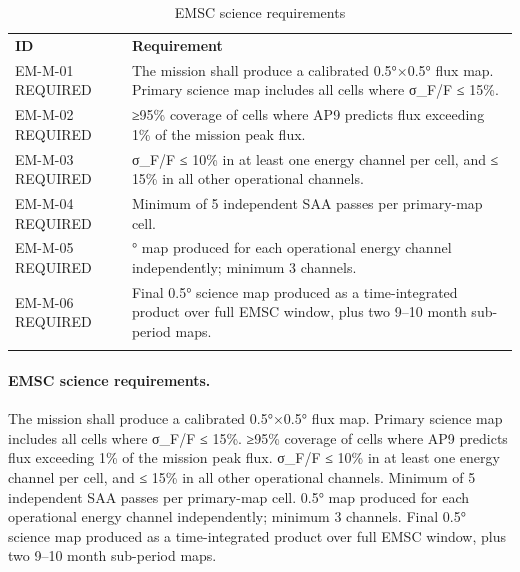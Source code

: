 \ifrequirementsedition
\begin{longtable}{@{}
  >{\raggedright\arraybackslash}p{}
  >{\raggedright\arraybackslash}p{}@{}}
\caption{EMSC science requirements}\label{tab:01-mission-context-9}\\
\toprule\noalign{}
\textbf{ID} & \textbf{Requirement} \\
EM-M-01 REQUIRED & The mission shall produce a calibrated 0.5°×0.5° flux map. Primary
science map includes all cells where σ\_F/F ≤ 15\%. \\
EM-M-02 REQUIRED & ≥95\% coverage of cells where AP9 predicts flux exceeding 1\% of the
mission peak flux. \\
EM-M-03 REQUIRED & σ\_F/F ≤ 10\% in at least one energy channel per cell, and ≤ 15\% in all
other operational channels. \\
EM-M-04 REQUIRED & Minimum of 5 independent SAA passes per primary-map cell. \\
EM-M-05 REQUIRED & 0.5° map produced for each operational energy channel independently;
minimum 3 channels. \\
EM-M-06 REQUIRED & Final 0.5° science map produced as a time-integrated product over full
EMSC window, plus two 9--10 month sub-period maps. \\
\midrule\noalign{}
\endhead
\bottomrule\noalign{}
\endlastfoot
\end{longtable}
\else
\paragraph{EMSC science requirements.} The mission shall produce a calibrated 0.5°×0.5° flux map. Primary
science map includes all cells where σ\_F/F ≤ 15\%. ≥95\% coverage of cells where AP9 predicts flux exceeding 1\% of the
mission peak flux. σ\_F/F ≤ 10\% in at least one energy channel per cell, and ≤ 15\% in all
other operational channels. Minimum of 5 independent SAA passes per primary-map cell. 0.5° map produced for each operational energy channel independently;
minimum 3 channels. Final 0.5° science map produced as a time-integrated product over full
EMSC window, plus two 9--10 month sub-period maps.
\fi


